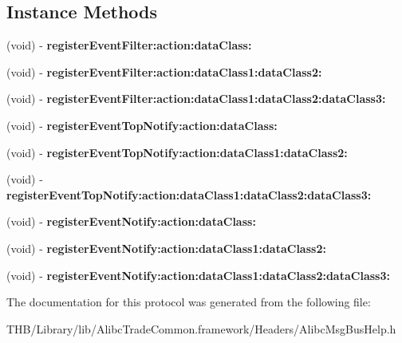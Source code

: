 \subsection*{Instance Methods}
\begin{DoxyCompactItemize}
\item 
\mbox{\label{protocol_a_m_p_msg_bus_help_protocol_01-p_a78d058300172a499cd72fb15073c21b6}} 
(void) -\/ {\bfseries register\+Event\+Filter\+:action\+:data\+Class\+:}
\item 
\mbox{\label{protocol_a_m_p_msg_bus_help_protocol_01-p_adb8fe62bb519c810833adfbdc00c1dee}} 
(void) -\/ {\bfseries register\+Event\+Filter\+:action\+:data\+Class1\+:data\+Class2\+:}
\item 
\mbox{\label{protocol_a_m_p_msg_bus_help_protocol_01-p_a8f756958318a30b30a17015837f98536}} 
(void) -\/ {\bfseries register\+Event\+Filter\+:action\+:data\+Class1\+:data\+Class2\+:data\+Class3\+:}
\item 
\mbox{\label{protocol_a_m_p_msg_bus_help_protocol_01-p_ab93102550959e4c26075b484b66df2db}} 
(void) -\/ {\bfseries register\+Event\+Top\+Notify\+:action\+:data\+Class\+:}
\item 
\mbox{\label{protocol_a_m_p_msg_bus_help_protocol_01-p_aab187843e9954555592df25682af4b24}} 
(void) -\/ {\bfseries register\+Event\+Top\+Notify\+:action\+:data\+Class1\+:data\+Class2\+:}
\item 
\mbox{\label{protocol_a_m_p_msg_bus_help_protocol_01-p_af7cb5a23316d56e30ad7501904d29d25}} 
(void) -\/ {\bfseries register\+Event\+Top\+Notify\+:action\+:data\+Class1\+:data\+Class2\+:data\+Class3\+:}
\item 
\mbox{\label{protocol_a_m_p_msg_bus_help_protocol_01-p_a9725487be9687bf2ea7ade45dd43e037}} 
(void) -\/ {\bfseries register\+Event\+Notify\+:action\+:data\+Class\+:}
\item 
\mbox{\label{protocol_a_m_p_msg_bus_help_protocol_01-p_afda3e8dd061f52cded833af2bae1b932}} 
(void) -\/ {\bfseries register\+Event\+Notify\+:action\+:data\+Class1\+:data\+Class2\+:}
\item 
\mbox{\label{protocol_a_m_p_msg_bus_help_protocol_01-p_a24f656b715145b139bf0fc96c1d71375}} 
(void) -\/ {\bfseries register\+Event\+Notify\+:action\+:data\+Class1\+:data\+Class2\+:data\+Class3\+:}
\end{DoxyCompactItemize}


The documentation for this protocol was generated from the following file\+:\begin{DoxyCompactItemize}
\item 
T\+H\+B/\+Library/lib/\+Alibc\+Trade\+Common.\+framework/\+Headers/Alibc\+Msg\+Bus\+Help.\+h\end{DoxyCompactItemize}
